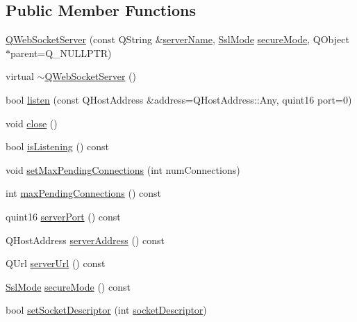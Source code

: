 \subsection*{Public Member Functions}
\begin{DoxyCompactItemize}
\item 
\mbox{\hyperlink{class_q_web_socket_server_a37bfbbb8ec6c171fd2b6b04b556dfc6d}{Q\+Web\+Socket\+Server}} (const Q\+String \&\mbox{\hyperlink{class_q_web_socket_server_afe6a71eb2545bc81df2d847c66259d1f}{server\+Name}}, \mbox{\hyperlink{class_q_web_socket_server_a07ce392fd4fa351746e48b00428366b8}{Ssl\+Mode}} \mbox{\hyperlink{class_q_web_socket_server_a5f5e751ea45b35bd67c9447d0b41aa73}{secure\+Mode}}, Q\+Object $\ast$parent=Q\+\_\+\+N\+U\+L\+L\+P\+TR)
\item 
virtual \mbox{\hyperlink{class_q_web_socket_server_aeb28af09252bac11fb1faf6b7fdee272}{$\sim$\+Q\+Web\+Socket\+Server}} ()
\item 
bool \mbox{\hyperlink{class_q_web_socket_server_a3859403d15dbb2b487a3990d68660841}{listen}} (const Q\+Host\+Address \&address=Q\+Host\+Address\+::\+Any, quint16 port=0)
\item 
void \mbox{\hyperlink{class_q_web_socket_server_aa4b5f9244c27cdd1b0c8ee830ac0c1e1}{close}} ()
\item 
bool \mbox{\hyperlink{class_q_web_socket_server_a4505cb4c119bc490f8bf401998c6df43}{is\+Listening}} () const
\item 
void \mbox{\hyperlink{class_q_web_socket_server_acc258d1094c0a0392c1e436bbff9c04a}{set\+Max\+Pending\+Connections}} (int num\+Connections)
\item 
int \mbox{\hyperlink{class_q_web_socket_server_afd3bb35892c8eeaf92ceddc1654c2de7}{max\+Pending\+Connections}} () const
\item 
quint16 \mbox{\hyperlink{class_q_web_socket_server_aafc6ff4b146c2b049df45922a2d9be7e}{server\+Port}} () const
\item 
Q\+Host\+Address \mbox{\hyperlink{class_q_web_socket_server_a8c9df0e8ad799e0ea633db852f37497a}{server\+Address}} () const
\item 
Q\+Url \mbox{\hyperlink{class_q_web_socket_server_aeb27943cc455da8fd6ea8e22ba3f2e60}{server\+Url}} () const
\item 
\mbox{\hyperlink{class_q_web_socket_server_a07ce392fd4fa351746e48b00428366b8}{Ssl\+Mode}} \mbox{\hyperlink{class_q_web_socket_server_a5f5e751ea45b35bd67c9447d0b41aa73}{secure\+Mode}} () const
\item 
bool \mbox{\hyperlink{class_q_web_socket_server_a9a4f765799fe4423be47c54c51a16b20}{set\+Socket\+Descriptor}} (int \mbox{\hyperlink{class_q_web_socket_server_a3b83cfc7602ecd27ca21a1ec80220dc0}{socket\+Descriptor}})

\end{DoxyCompactItemize}
